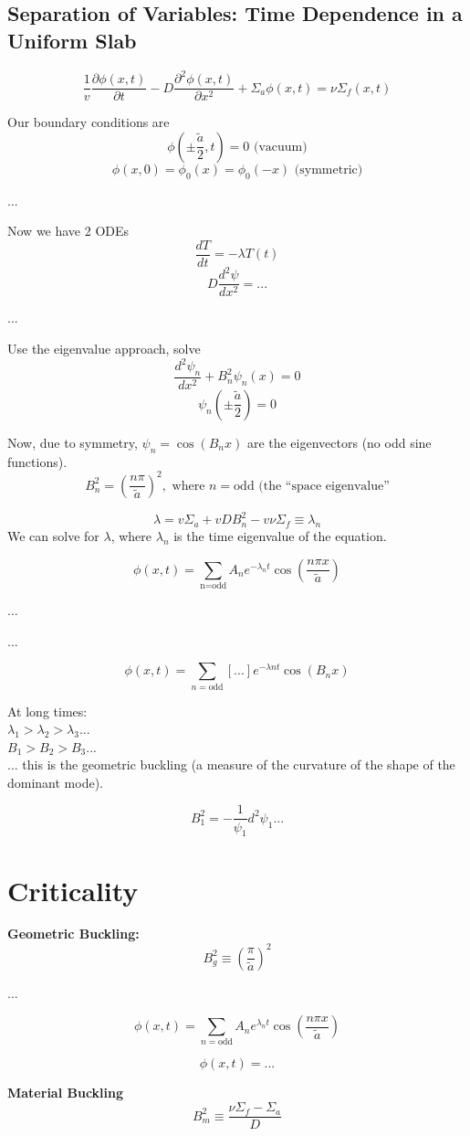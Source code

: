 \documentclass{report}
\newcommand{\h}[1]{\section*{#1}}
\newcommand{\hh}[1]{\subsection*{#1}}
\newcommand{\p}{\partial}
\newcommand{\Xs}{\Sigma}
\newcommand{\Oov}{\frac{1}{v}}
\begin{document}
\hh{Separation of Variables: Time Dependence in a Uniform Slab}

$$ \Oov \frac{\p\phi(x,t)}{\p t} - D\frac{\p^2\phi(x,t)}{\p x^2} + \Xs_a \phi(x,t) = \nu\Xs_f(x,t)$$

Our boundary conditions are 
$$ \phi(\pm\frac{\tilde{a}}{2},t) = 0 \text{ (vacuum)}$$
$$ \phi(x,0) = \phi_0(x) = \phi_0(-x) \text{ (symmetric)}$$


...

Now we have 2 ODEs
$$ \frac{dT}{dt} = -\lambda T(t) $$
$$ D\frac{d^2\psi}{dx^2} = ... $$

...

Use the eigenvalue approach, solve
$$ \frac{d^2\psi_n}{dx^2} + B_n^2\psi_n(x)=0 $$
$$ \psi_n(\pm\frac{\tilde{a}}{2}) = 0 $$

Now, due to symmetry, $\psi_n = \cos(B_n x)$ are the eigenvectors (no odd sine functions).
$$ B_n^2 = \left( \frac{n\pi}{\tilde{a}} \right)^2, \text{ where }n=\text{odd (the ``space eigenvalue''} $$

$$ \lambda = v \Xs_a + vDB_n^2 - v\nu\Xs_f \equiv \lambda_n $$
We can solve for $\lambda$, where $\lambda_n$ is the time eigenvalue of the equation.

$$ \phi(x,t) = \sum_{\text{n=odd}} A_n e^{-\lambda_n t}\cos\left(\frac{n \pi x}{\tilde{a}}\right)$$

...

...

$$ \phi(x,t) = \sum_{n=\text{odd}} \left[ ... \right]e^{-\lambda n t}\cos(B_n x)  $$

At long times: \\
$\lambda_1 > \lambda_2 > \lambda_3 ...$ \\
$B_1 > B_2 > B_3 ...$ \\
... this is the geometric buckling (a measure of the curvature of the shape of the dominant mode). 

$$ B_1^2 = -\frac{1}{\psi_1}{d^2\psi_1}{...} $$



\h{Criticality}

\textbf{Geometric Buckling:}
$$ B_g^2 \equiv \left(\frac{\pi}{\tilde{a}}\right)^2 $$

...

$$ \phi(x,t) = \sum_{n=\text{odd}} A_n e^{\lambda_n t} \cos\left(\frac{n\pi x}{\tilde{a}}\right) $$

$$ \phi(x,t) = ... $$

\textbf{Material Buckling}
$$ B_m^2 \equiv \frac{\nu \Xs_f-\Xs_a}{D} $$
\end{document}
